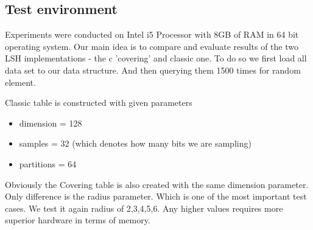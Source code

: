   \subsection{Test environment} 
  Experiments were conducted on Intel i5 Processor with 8GB of RAM in 64 bit
  operating system.  
\label{evaluation}
Our main idea is to compare and evaluate results of the two LSH implementations
- the c 'covering' and classic one. To do so we first load all data set to our
data structure. And then querying them 1500 times for random element. 

Classic table is constructed with given parameters
\begin{itemize}
 \item dimension = 128
 \item samples = 32 (which denotes how many bits we are sampling)
 \item partitions = 64
\end{itemize}
Obviously the Covering table is also created with the same dimension parameter.
Only difference is the radius parameter. Which is one of the most important test
cases. We test it again radius of 2,3,4,5,6. Any higher values requires more
superior hardware in terms of memory.
 
